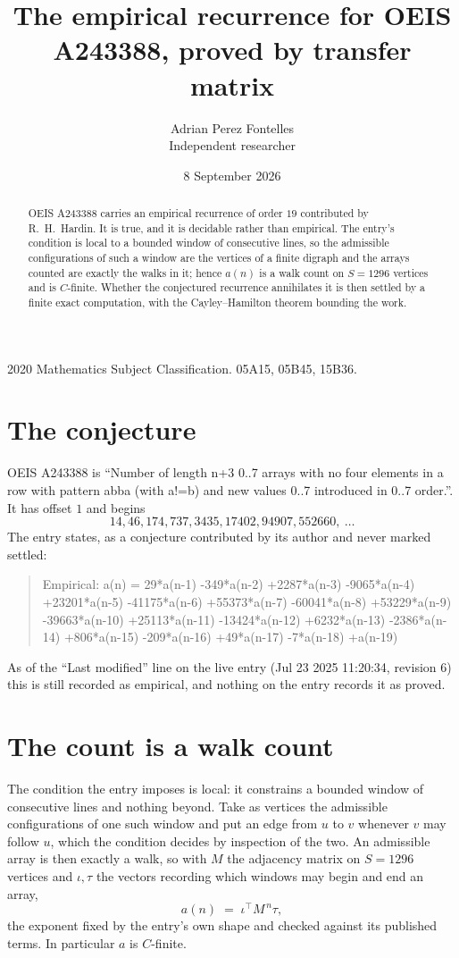 \documentclass[11pt,a4paper]{article}
\title{The empirical recurrence for OEIS A243388, proved by transfer matrix}
\author{Adrian Perez Fontelles\\ \small Independent researcher}
\date{8 September 2026}
\theoremstyle{plain}
\theoremstyle{definition}
\begin{document}
\maketitle

\begin{abstract}
OEIS A243388 carries an empirical recurrence of order $19$ contributed by R.~H.~Hardin. It is
true, and it is decidable rather than empirical. The entry's condition is local to a bounded window of consecutive lines, so
the admissible configurations of such a window are the vertices of a finite digraph and the
arrays counted are exactly the walks in it; hence $a(n)$ is a walk count on $S=1296$ vertices
and is $C$-finite. Whether the conjectured recurrence annihilates it is then settled by a
finite exact computation, with the Cayley--Hamilton theorem bounding the work.
\end{abstract}

\noindent\small 2020 Mathematics Subject Classification. 05A15, 05B45, 15B36.\normalsize

\section{The conjecture}

OEIS A243388 is ``Number of length n+3 0..7 arrays with no four elements in a row with pattern abba (with a!=b) and new values 0..7 introduced in 0..7 order.''. It has offset $1$ and begins
\[
14, 46, 174, 737, 3435, 17402, 94907, 552660,\ \dots
\]
The entry states, as a conjecture contributed by its author and never marked settled:
\begin{quote}
Empirical: a(n) = 29*a(n-1) -349*a(n-2) +2287*a(n-3) -9065*a(n-4) +23201*a(n-5) -41175*a(n-6) +55373*a(n-7) -60041*a(n-8) +53229*a(n-9) -39663*a(n-10) +25113*a(n-11) -13424*a(n-12) +6232*a(n-13) -2386*a(n-14) +806*a(n-15) -209*a(n-16) +49*a(n-17) -7*a(n-18) +a(n-19)
\end{quote}
As of the ``Last modified'' line on the live entry (Jul 23 2025 11:20:34, revision 6) this is still
recorded as empirical, and nothing on the entry records it as proved.

\section{The count is a walk count}

The condition the entry imposes is local: it constrains a bounded window of consecutive lines and nothing beyond. Take as
vertices the admissible configurations of one such window and put an edge from $u$ to $v$
whenever $v$ may follow $u$, which the condition decides by inspection of the two. An
admissible array is then exactly a walk, so with $M$ the adjacency matrix on $S=1296$ vertices
and $\iota,\tau$ the vectors recording which windows may begin and end an array,
\[
a(n)\;=\;\iota^{\!\top}M^{\,n}\tau ,
\]
the exponent fixed by the entry's own shape and checked against its published terms. In
particular $a$ is $C$-finite.
\end{document}

